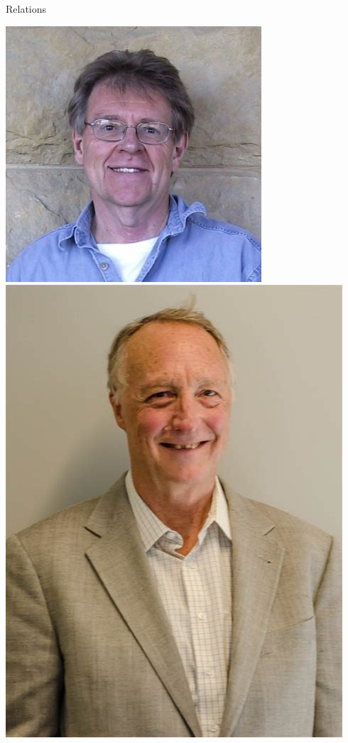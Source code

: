 \documentclass[10pt,t]{beamer} %
\begin{document}
\begin{frame}[c]{Relations}
	\begin{center}
		\includegraphics[scale=.21]{brumfiel}
		\hspace*{1cm}
		\includegraphics[scale=.09]{morgan}
	\end{center}
	
\end{frame}
\end{document}
